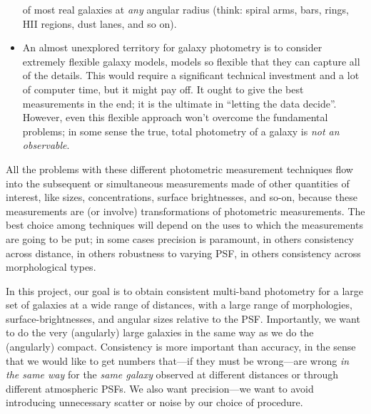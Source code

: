 \documentclass[12pt,preprint,pdftex]{aastex}
\begin{document}
\begin{itemize}
  of most real galaxies at \emph{any} angular radius (think: spiral
  arms, bars, rings, HII regions, dust lanes, and so on).
\item An almost unexplored territory for galaxy photometry is to
  consider extremely flexible galaxy models, models so flexible that
  they can capture all of the details.  This would require a
  significant technical investment and a lot of computer time, but it
  might pay off.  It ought to give the best measurements in the end;
  it is the ultimate in ``letting the data decide''.  However, even
  this flexible approach won't overcome the fundamental problems; in
  some sense the true, total photometry of a galaxy is \emph{not an
    observable}.
\end{itemize}
All the problems with these different photometric measurement
techniques flow into the subsequent or simultaneous measurements made
of other quantities of interest, like sizes, concentrations, surface
brightnesses, and so-on, because these measurements are (or involve)
transformations of photometric measurements.  The best choice among
techniques will depend on the uses to which the measurements are going
to be put; in some cases precision is paramount, in others consistency
across distance, in others robustness to varying PSF, in others
consistency across morphological types.

In this project, our goal is to obtain consistent multi-band
photometry for a large set of galaxies at a wide range of distances,
with a large range of morphologies, surface-brightnesses, and angular
sizes relative to the PSF.  Importantly, we want to do the very
(angularly) large galaxies in the same way as we do the (angularly)
compact.  Consistency is more important than accuracy, in the sense
that we would like to get numbers that---if they must be wrong---are
wrong \emph{in the same way} for the \emph{same galaxy} observed at
different distances or through different atmospheric PSFs.  We also
want precision---we want to avoid introducing unnecessary scatter or
noise by our choice of procedure.
\end{document}
